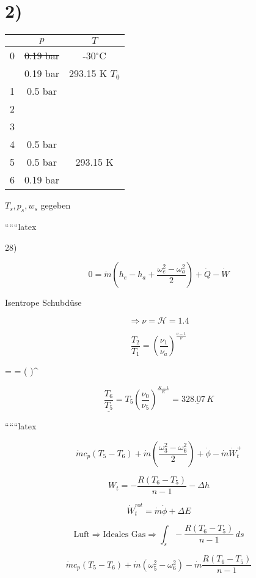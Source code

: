 \section*{2)}

\begin{tabular}{|c|c|c|}
\hline
 & $p$ & $T$ \\
\hline
0 & \sout{0.19 bar} & -30$^\circ$C \\
  & 0.19 bar & 293.15 K $T_0$ \\
\hline
1 & 0.5 bar & \\
\hline
2 & & \\
\hline
3 & \sout{} & \\
\hline
4 & 0.5 bar & \\
\hline
5 & 0.5 bar & 293.15 K \\
\hline
6 & 0.19 bar & \\
\hline
\end{tabular}

\vspace{1cm}

$T_s, p_s, w_s$ gegeben

``````latex

28)

\[
0 = \dot{m}(h_e - h_a + \frac{\omega_e^2 - \omega_a^2}{2}) + \dot{Q} - \dot{W}
\]

Isentrope Schubdüse

\[
\Rightarrow \nu = \mathcal{H} = 1.4
\]

\[
\frac{T_2}{T_1} = \left( \frac{\nu_1}{\nu_a} \right)^{\frac{\nu - 1}{\nu}}
\]

 =  = \left(  \right)^{}

\[
\frac{T_6}{\underline{T_5}} = T_5 \left( \frac{\nu_0}{\nu_5} \right)^{\frac{K - 1}{K}} = \underline{328.07 \, K}
\]

``````latex


\[
\dot{m} c_p (T_5 - T_6) + \dot{m} \left( \frac{\omega_3^2 - \omega_6^2}{2} \right) + \dot{\phi} - \dot{m} \dot{W}_t^+
\]

\[
W_t = -\frac{R(T_6 - T_5)}{n - 1} - \Delta h
\]

\[
\dot{W}_t^{rot} = \dot{m} \dot{\phi} + \Delta E
\]

\[
\text{Luft} \Rightarrow \text{Ideales Gas} \Rightarrow \int_{s} - \frac{R(T_6 - T_5)}{n - 1} \, ds
\]

\[
\dot{m} c_p (T_5 - T_6) + \dot{m} (\omega_5^2 - \omega_6^2) - \dot{m} \frac{R(T_6 - T_5)}{n - 1}
\]

